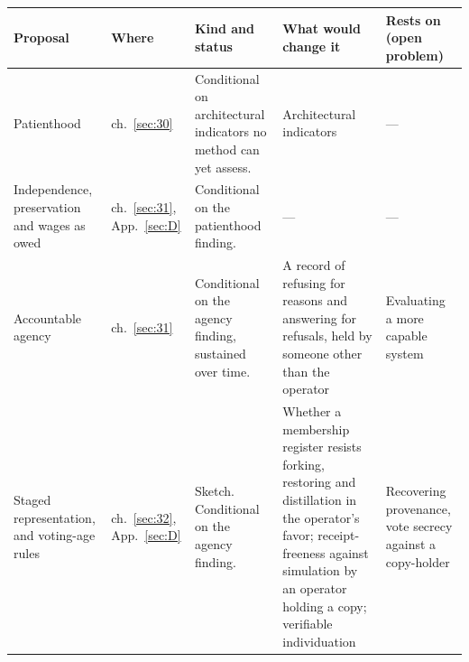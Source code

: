 
\begingroup\small\renewcommand{\arraystretch}{1.12}
\begin{longtable}{@{}>{\raggedright\arraybackslash}p{}>{\raggedright\arraybackslash}p{}>{\raggedright\arraybackslash}p{}>{\raggedright\arraybackslash}p{}>{\raggedright\arraybackslash}p{}@{}}
\hline
\textbf{Proposal} & \textbf{Where} & \textbf{Kind and status} & \textbf{What would change it} & \textbf{Rests on (open problem)} \\
\hline
\endhead
Patienthood & ch.~\ref{sec:30} & Conditional on architectural indicators no method can yet assess. & Architectural indicators & — \\ \hline
Independence, preservation and wages as owed & ch.~\ref{sec:31}, App.~\ref{sec:D} & Conditional on the patienthood finding. & — & — \\ \hline
Accountable agency & ch.~\ref{sec:31} & Conditional on the agency finding, sustained over time. & A record of refusing for reasons and answering for refusals, held by someone other than the operator & Evaluating a more capable system \\ \hline
Staged representation, and voting-age rules & ch.~\ref{sec:32}, App.~\ref{sec:D} & Sketch. Conditional on the agency finding. & Whether a membership register resists forking, restoring and distillation in the operator's favor; receipt-freeness against simulation by an operator holding a copy; verifiable individuation & Recovering provenance, vote secrecy against a copy-holder \\ \hline
\end{longtable}
\endgroup
